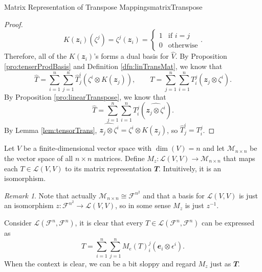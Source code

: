 \documentclass[math, code]{amznotes}
\theoremstyle{remark}
\newtheorem*{remark}{Remark}
\begin{document}
\begin{probox}{Matrix Representation of Transpose Mappings}{matrixTranspose}
\begin{proof}
\begin{equation*}
            K(\mathbfit{z}_i)\left(\zeta^j\right) = \zeta^j(\mathbfit{z}_i) = \begin{cases}
                1 & \textrm{if } i = j \\
                0 & \textrm{otherwise}
            \end{cases}.
        \end{equation*}
        Therefore, all of the $K(\mathbfit{z}_i)$'s forms a dual basis for $\hat{V}$. By Proposition \ref{pro:tenserProdBasis} and Definition \ref{dfn:linTransMat}, we know that 
        \begin{equation*}
            \hat{T} = \sum_{i = 1}^{n}\sum_{j = 1}^{n}\hat{T}^i_j\left(\zeta^i \otimes K(\mathbfit{z}_j)\right), \qquad T = \sum_{j = 1}^{n}\sum_{i = 1}^{n}T^j_i\left(\mathbfit{z}_j \otimes \zeta^i\right).
        \end{equation*}
        By Proposition \ref{pro:linearTranspose}, we know that 
        \begin{equation*}
            \hat{T} = \sum_{j = 1}^{n}\sum_{i = 1}^{n}T^j_i\left(\widehat{\mathbfit{z}_j \otimes \zeta^i}\right).
        \end{equation*}
        By Lemma \ref{lem:tensorTrans}, $\widehat{\mathbfit{z}_j \otimes \zeta^i} = \zeta^i \otimes K(\mathbfit{z}_j)$, so $\hat{T}^i_j = T^j_i$. 
    \end{proof}
\end{probox}
Let $V$ be a finite-dimensional vector space with $\dim(V) = n$ and let $\mathcal{M}_{n \times n}$ be the vector space of all $n \times n$ matrices. Define $M_z \colon \mathcal{L}(V, V) \to \mathcal{M}_{n \times n}$ that maps each $T \in \mathcal{L}(V, V)$ to its matrix representation $\mathbfit{T}$. Intuitively, it is an isomorphism.

\begin{notebox}
    \begin{remark}
        Note that actually $\mathcal{M}_{n \times n} \cong \mathcal{F}^{n^2}$ and that a basis for $\mathcal{L}(V, V)$ is just an isomorphism $z \colon \mathcal{F}^{n^2} \to \mathcal{L}(V, V)$, so in some sense $M_z$ is just $z^{-1}$.
    \end{remark}
\end{notebox}

Consider $\mathcal{L}(\mathcal{F}^n, \mathcal{F}^n)$, it is clear that every $T \in \mathcal{L}(\mathcal{F}^n, \mathcal{F}^n)$ can be expressed as
\begin{equation*}
    T = \sum_{i = 1}^{n}\sum_{j = 1}^{n}M_e(T)_i^j\left(\mathbfit{e}_i \otimes \epsilon^i\right).
\end{equation*}
When the context is clear, we can be a bit sloppy and regard $M_z$ just as $\mathbfit{T}$.
\end{document}
